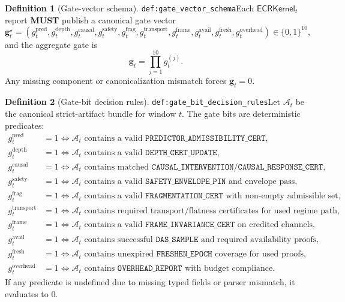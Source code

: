 \documentclass[11pt]{article}
\theoremstyle{definition}
\newtheorem{definition}{Definition}
\theoremstyle{plain}
\newcommand{\MUST}{\textbf{MUST}}
\newcommand{\lbl}[1]{\texttt{\footnotesize\nolinkurl{#1}}}
\newcommand{\DefLabel}[1]{\hfill{\small\lbl{#1}}}
\begin{document}
\begin{definition}[Gate-vector schema]\DefLabel{def:gate_vector_schema}\label{def:gate_vector_schema}
Each $\mathsf{ECRKernel}_t$ report \MUST{} publish a canonical gate vector
\[
\mathbf{g}^{\star}_t=(g^{\mathrm{pred}}_t,g^{\mathrm{depth}}_t,g^{\mathrm{causal}}_t,g^{\mathrm{safety}}_t,g^{\mathrm{frag}}_t,g^{\mathrm{transport}}_t,g^{\mathrm{frame}}_t,g^{\mathrm{avail}}_t,g^{\mathrm{fresh}}_t,g^{\mathrm{overhead}}_t)\in\{0,1\}^{10},
\]
and the aggregate gate is
\[
\mathbf{g}_t=\prod_{j=1}^{10} g^{(j)}_t.
\]
Any missing component or canonicalization mismatch forces $\mathbf{g}_t=0$.
\end{definition}

\begin{definition}[Gate-bit decision rules]\DefLabel{def:gate_bit_decision_rules}\label{def:gate_bit_decision_rules}
Let $\mathcal{A}_t$ be the canonical strict-artifact bundle for window $t$.
The gate bits are deterministic predicates:
\begin{align*}
g^{\mathrm{pred}}_t&=1 \iff \mathcal{A}_t \text{ contains a valid } \texttt{PREDICTOR\_ADMISSIBILITY\_CERT},\\
g^{\mathrm{depth}}_t&=1 \iff \mathcal{A}_t \text{ contains a valid } \texttt{DEPTH\_CERT\_UPDATE},\\
g^{\mathrm{causal}}_t&=1 \iff \mathcal{A}_t \text{ contains matched } \texttt{CAUSAL\_INTERVENTION}/\texttt{CAUSAL\_RESPONSE\_CERT},\\
g^{\mathrm{safety}}_t&=1 \iff \mathcal{A}_t \text{ contains a valid } \texttt{SAFETY\_ENVELOPE\_PIN}\text{ and envelope pass},\\
g^{\mathrm{frag}}_t&=1 \iff \mathcal{A}_t \text{ contains a valid } \texttt{FRAGMENTATION\_CERT}\text{ with non-empty admissible set},\\
g^{\mathrm{transport}}_t&=1 \iff \mathcal{A}_t \text{ contains required transport/flatness certificates for used regime path},\\
g^{\mathrm{frame}}_t&=1 \iff \mathcal{A}_t \text{ contains a valid } \texttt{FRAME\_INVARIANCE\_CERT}\text{ on credited channels},\\
g^{\mathrm{avail}}_t&=1 \iff \mathcal{A}_t \text{ contains successful } \texttt{DAS\_SAMPLE}\text{ and required availability proofs},\\
g^{\mathrm{fresh}}_t&=1 \iff \mathcal{A}_t \text{ contains unexpired } \texttt{FRESHEN\_EPOCH}\text{ coverage for used proofs},\\
g^{\mathrm{overhead}}_t&=1 \iff \mathcal{A}_t \text{ contains } \texttt{OVERHEAD\_REPORT}\text{ with budget compliance}.
\end{align*}
If any predicate is undefined due to missing typed fields or parser mismatch, it evaluates to $0$.
\end{definition}
\end{document}
